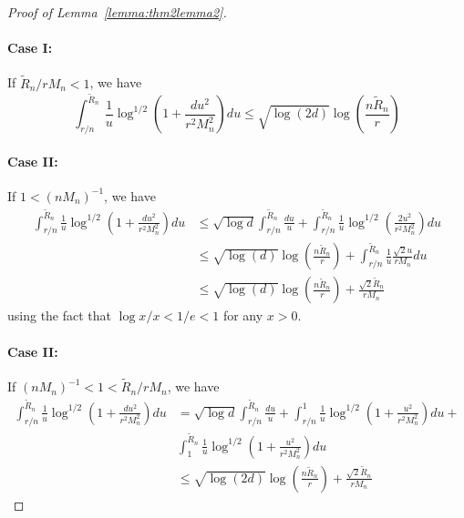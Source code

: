 \documentclass[11pt,letterpaper]{article}
\numberwithin{equation}{section}
\begin{document}
\begin{proof}[Proof of Lemma~\ref{lemma:thm2lemma2}]
\paragraph{Case I:} If $\tilde R_n/r M_n < 1$, we have
%
$$
\int_{r/n}^{\tilde R_n} \frac{1}{u} \log^{1/2} \left( 1 + \frac{ d u^2}{r^2 M_n^2} \right) du \leq
\sqrt{\log (2d)} \log \left( \frac{n \tilde R_n}{r} \right)
$$

\paragraph{Case II:} If $1 < (nM_n)^{-1}$, we have
%
\begin{align*}
\int_{r/n}^{\tilde R_n} \frac{1}{u} \log^{1/2} \left( 1 + \frac{ d u^2}{r^2 M_n^2} \right) du
& \leq \sqrt{\log d} \int_{r/n}^{\tilde R_n} \frac{du}{u} +
\int_{r/n}^{\tilde R_n} \frac{1}{u} \log^{1/2} \left( \frac{2 u^2}{r^2 M_n^2} \right) du \\
& \leq \sqrt{\log (d)} \log \left( \frac{n \tilde R_n}{r} \right) +
\int_{r/n}^{\tilde R_n} \frac{1}{u} \frac{\sqrt 2 u}{r M_n} du \\
& \leq \sqrt{\log (d)} \log \left( \frac{n \tilde R_n}{r} \right) + \frac{\sqrt 2 \tilde R_n}{r M_n}
\end{align*}
%
using the fact that $\log x/x < 1/e < 1$ for any $x>0$.

\paragraph{Case II:} If $(nM_n)^{-1} < 1 < \tilde R_n/r M_n$, we have
%
\begin{align*}
\int_{r/n}^{\tilde R_n} \frac{1}{u} \log^{1/2} \left( 1 + \frac{ d u^2}{r^2 M_n^2} \right) du &=
\sqrt{\log d} \int_{r/n}^{\tilde R_n} \frac{du}{u} +
\int_{r/n}^{1} \frac{1}{u} \log^{1/2} \left( 1 + \frac{u^2}{r^2 M_n^2} \right) du +\\
& \int_{1}^{\tilde R_n} \frac{1}{u} \log^{1/2} \left( 1 + \frac{u^2}{r^2 M_n^2} \right) du \\
& \leq \sqrt{\log (2d)} \log \left( \frac{n \tilde R_n}{r} \right) + \frac{\sqrt 2 \tilde R_n}{r M_n}
\end{align*}
%


\end{proof}
\end{document}
